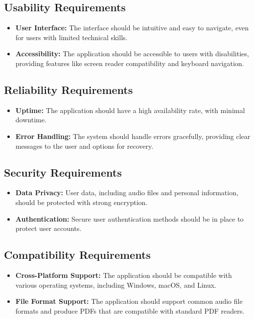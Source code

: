 \documentclass{article}
\begin{document}
\subsection{Usability Requirements}
\begin{itemize}
    \item \textbf{User Interface:} The interface should be intuitive and easy to navigate, even for users with limited technical skills.
    \item \textbf{Accessibility:} The application should be accessible to users with disabilities, providing features like screen reader compatibility and keyboard navigation.
\end{itemize}

\subsection{Reliability Requirements}
\begin{itemize}
    \item \textbf{Uptime:} The application should have a high availability rate, with minimal downtime.
    \item \textbf{Error Handling:} The system should handle errors gracefully, providing clear messages to the user and options for recovery.
\end{itemize}

\subsection{Security Requirements}
\begin{itemize}
    \item \textbf{Data Privacy:} User data, including audio files and personal information, should be protected with strong encryption.
    \item \textbf{Authentication:} Secure user authentication methods should be in place to protect user accounts.
\end{itemize}

\subsection{Compatibility Requirements}
\begin{itemize}
    \item \textbf{Cross-Platform Support:} The application should be compatible with various operating systems, including Windows, macOS, and Linux.
    \item \textbf{File Format Support:} The application should support common audio file formats and produce PDFs that are compatible with standard PDF readers.
\end{itemize}
\end{document}
